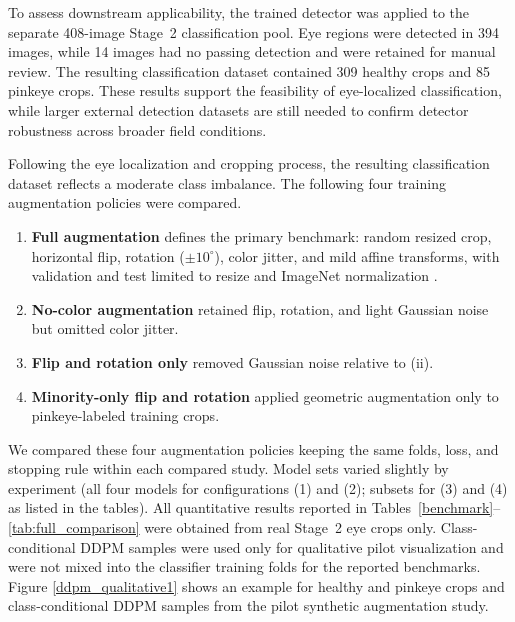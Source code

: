 \documentclass[preprint,12pt,authoryear]{elsarticle}
\begin{document}
To assess downstream applicability, the trained detector was applied to the separate 408-image Stage~2 classification pool. Eye regions were detected in 394 images, while 14 images had no passing detection and were retained for manual review. The resulting classification dataset contained 309 healthy crops and 85 pinkeye crops. These results support the feasibility of eye-localized classification, while larger external detection datasets are still needed to confirm detector robustness across broader field conditions.
%
%

Following the eye localization and cropping process, the resulting classification dataset reflects a moderate class imbalance. The following four training augmentation policies were compared. 
\begin{enumerate}
\item \textbf{Full augmentation} defines the primary benchmark: random resized crop, horizontal flip, rotation ($\pm 10^{\circ}$), color jitter, and mild affine transforms, with validation and test limited to resize and ImageNet normalization \citep{rw2019timm}.
\item  \textbf{No-color augmentation} retained flip, rotation, and light Gaussian noise but omitted color jitter.
\item \textbf{Flip and rotation only} removed Gaussian noise relative to (ii). 
\item \textbf{Minority-only flip and rotation} applied geometric augmentation only to pinkeye-labeled training crops.
\end{enumerate}
We compared these four augmentation policies keeping the same folds, loss, and stopping rule within each compared study. Model sets varied slightly by experiment (all four models for configurations (1) and (2); subsets for (3) and (4) as listed in the tables). All quantitative results reported in Tables~\ref{benchmark}--\ref{tab:full_comparison} were obtained from real Stage~2 eye crops only. Class-conditional DDPM samples were used only for qualitative pilot visualization and were not mixed into the classifier training folds for the reported benchmarks. Figure \ref{ddpm_qualitative1} shows an example for healthy and pinkeye crops and class-conditional DDPM samples from the pilot synthetic augmentation study.
\end{document}
